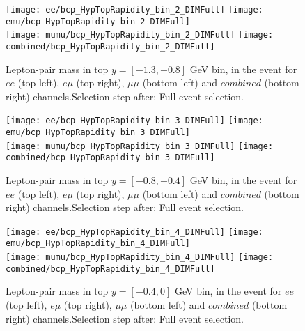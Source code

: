 \clearpage
\newpage


\begin{figure}
  \texttt{[image: ee/bcp\_HypTopRapidity\_bin\_2\_DIMFull]}
  \texttt{[image: emu/bcp\_HypTopRapidity\_bin\_2\_DIMFull]}\\
  \texttt{[image: mumu/bcp\_HypTopRapidity\_bin\_2\_DIMFull]}
  \texttt{[image: combined/bcp\_HypTopRapidity\_bin\_2\_DIMFull]}
\caption{Lepton-pair mass in top $y = [-1.3,-0.8]$ GeV bin, in the event for $ee$ (top left), $e\mu$ (top right), $\mu\mu$ (bottom left) and $combined$ (bottom right) channels.\newline Selection step after: Full event selection.}
\end{figure}

\clearpage
\newpage


\begin{figure}
  \texttt{[image: ee/bcp\_HypTopRapidity\_bin\_3\_DIMFull]}
  \texttt{[image: emu/bcp\_HypTopRapidity\_bin\_3\_DIMFull]}\\
  \texttt{[image: mumu/bcp\_HypTopRapidity\_bin\_3\_DIMFull]}
  \texttt{[image: combined/bcp\_HypTopRapidity\_bin\_3\_DIMFull]}
\caption{Lepton-pair mass in top $y = [-0.8,-0.4]$ GeV bin, in the event for $ee$ (top left), $e\mu$ (top right), $\mu\mu$ (bottom left) and $combined$ (bottom right) channels.\newline Selection step after: Full event selection.}
\end{figure}

\clearpage
\newpage

\begin{figure}
  \texttt{[image: ee/bcp\_HypTopRapidity\_bin\_4\_DIMFull]}
  \texttt{[image: emu/bcp\_HypTopRapidity\_bin\_4\_DIMFull]}\\
  \texttt{[image: mumu/bcp\_HypTopRapidity\_bin\_4\_DIMFull]}
  \texttt{[image: combined/bcp\_HypTopRapidity\_bin\_4\_DIMFull]}
\caption{Lepton-pair mass in top $y = [-0.4,0]$ GeV bin, in the event for $ee$ (top left), $e\mu$ (top right), $\mu\mu$ (bottom left) and $combined$ (bottom right) channels.\newline Selection step after: Full event selection.}
\end{figure}

